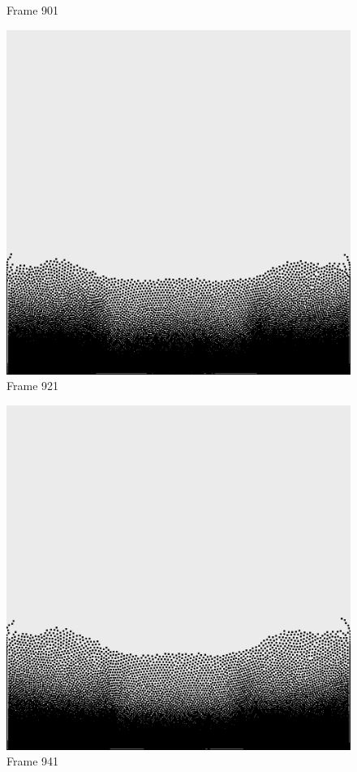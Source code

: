 \documentclass[a4paper, 12pt, oneside]{book}
\begin{document}
\begin{figure}[!ht]
\begin{center}
            Frame 901
        \end{center}
    \endminipage
    \hfill
        \begin{center}
            \includegraphics[width=\linewidth]{images/test_case_1/921.png}
            Frame 921
        \end{center}
    \endminipage
    \hfill
        \begin{center}
            \includegraphics[width=\linewidth]{images/test_case_1/941.png}
            Frame 941
        \end{center}
    \endminipage
    \hfill


\end{figure}
\end{document}
